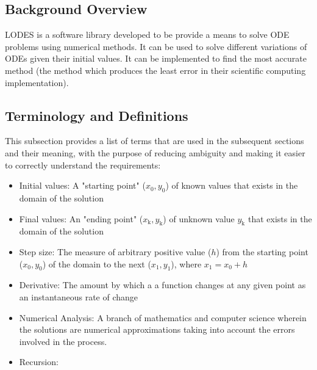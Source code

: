 \documentclass[12pt]{article}
\newcommand{\progname}{LODES} %
\begin{document}
\subsection{Background Overview} \label{Sec_bo}

\progname{} is a software library developed to be provide a means to solve ODE problems
using numerical methods. It can be used to solve different variations of ODEs given their initial values.
It can be implemented to find the most accurate method (the method which produces the least error in their
scientific computing implementation).

\subsection{Terminology and Definitions}

This subsection provides a list of terms that are used in the subsequent
sections and their meaning, with the purpose of reducing ambiguity and making it
easier to correctly understand the requirements:

\begin{itemize}

\item Initial values: A "starting point" ($x_\text{0}, y_\text{0}$) of known values that
exists in the domain of the solution

\item Final values: An "ending point" ($x_\text{k}, y_\text{k}$) of unknown value $y_\text{k}$
that exists in the domain of the solution

\item Step size: The measure of arbitrary positive value ($h$) from the starting point
($x_\text{0}, y_\text{0}$) of the domain to the next ($x_\text{1}, y_\text{1}$), where
$x_\text{1} = x_\text{0} + h$

\item Derivative: The amount by which a a function changes at any given point as an instantaneous
rate of change

\item Numerical Analysis: A branch of mathematics and computer science wherein the solutions
are numerical approximations taking into account the errors involved in the process.

\item Recursion: 


\end{itemize}
\end{document}

